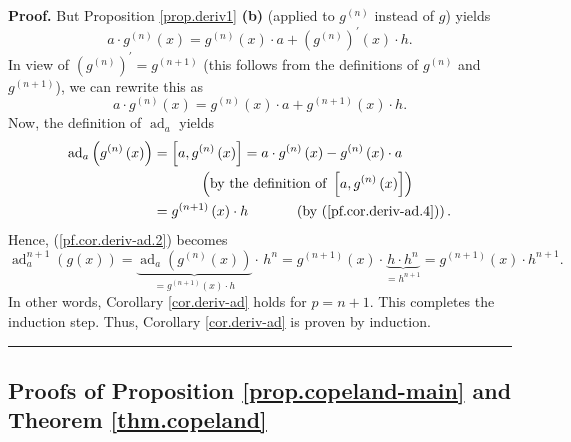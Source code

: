 \documentclass[numbers=enddot,12pt,final,onecolumn,notitlepage]{scrartcl}%
\theoremstyle{definition}
\newenvironment{proof}[1][Proof]{\noindent\textbf{#1.} }{\ \rule{0.5em}{0.5em}}
\begin{document}
\begin{proof}
But Proposition \ref{prop.deriv1} \textbf{(b)} (applied to $g^{\left(
n\right)  }$ instead of $g$) yields
\[
a\cdot g^{\left(  n\right)  }\left(  x\right)  =g^{\left(  n\right)  }\left(
x\right)  \cdot a+\left(  g^{\left(  n\right)  }\right)  ^{\prime}\left(
x\right)  \cdot h.
\]
In view of $\left(  g^{\left(  n\right)  }\right)  ^{\prime}=g^{\left(
n+1\right)  }$ (this follows from the definitions of $g^{\left(  n\right)  }$
and $g^{\left(  n+1\right)  }$), we can rewrite this as%
\begin{equation}
a\cdot g^{\left(  n\right)  }\left(  x\right)  =g^{\left(  n\right)  }\left(
x\right)  \cdot a+g^{\left(  n+1\right)  }\left(  x\right)  \cdot h.
\label{pf.cor.deriv-ad.4}%
\end{equation}
Now, the definition of $\operatorname*{ad}\nolimits_{a}$ yields%
\begin{align*}
\operatorname*{ad}\nolimits_{a}\left(  g^{\left(  n\right)  }\left(  x\right)
\right)   &  =\left[  a,g^{\left(  n\right)  }\left(  x\right)  \right]
=a\cdot g^{\left(  n\right)  }\left(  x\right)  -g^{\left(  n\right)  }\left(
x\right)  \cdot a\\
&  \ \ \ \ \ \ \ \ \ \ \left(  \text{by the definition of }\left[
a,g^{\left(  n\right)  }\left(  x\right)  \right]  \right) \\
&  =g^{\left(  n+1\right)  }\left(  x\right)  \cdot
h\ \ \ \ \ \ \ \ \ \ \left(  \text{by (\ref{pf.cor.deriv-ad.4})}\right)  .
\end{align*}
Hence, (\ref{pf.cor.deriv-ad.2}) becomes%
\[
\operatorname*{ad}\nolimits_{a}^{n+1}\left(  g\left(  x\right)  \right)
=\underbrace{\operatorname*{ad}\nolimits_{a}\left(  g^{\left(  n\right)
}\left(  x\right)  \right)  }_{=g^{\left(  n+1\right)  }\left(  x\right)
\cdot h}\cdot\, h^{n}=g^{\left(  n+1\right)  }\left(  x\right)  \cdot
\underbrace{h\cdot h^{n}}_{=h^{n+1}}=g^{\left(  n+1\right)  }\left(  x\right)
\cdot h^{n+1}.
\]
In other words, Corollary \ref{cor.deriv-ad} holds for $p=n+1$. This completes
the induction step. Thus, Corollary \ref{cor.deriv-ad} is proven by induction.
\end{proof}

\subsection{Proofs of Proposition \ref{prop.copeland-main} and Theorem
\ref{thm.copeland}}
\end{document}

